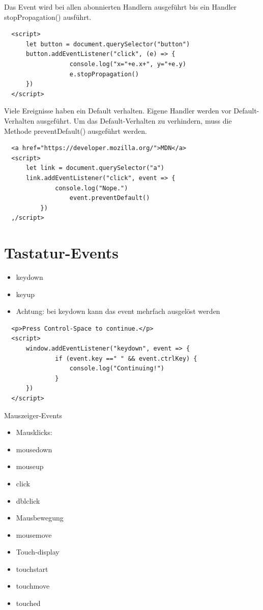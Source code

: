   Das Event wird bei allen abonnierten Handlern ausgeführt bis ein Handler stopPropagation() ausführt.
  
  \begin{verbatim}
  <script>
      let button = document.querySelector("button")
      button.addEventListener("click", (e) => {
                  console.log("x="+e.x+", y="+e.y)
                  e.stopPropagation()
      })
  </script>
  \end{verbatim}
  
  Viele Ereignisse haben ein Default verhalten. Eigene Handler werden vor Default-Verhalten ausgeführt. Um das Default-Verhalten zu verhindern, muss die Methode preventDefault() ausgeführt werden.
  
  \begin{verbatim}
  <a href="https://developer.mozilla.org/">MDN</a>
  <script>
      let link = document.querySelector("a")
      link.addEventListener("click", event => {
              console.log("Nope.")
                  event.preventDefault()
          })
  ,/script>
  \end{verbatim}
  
  \section*{Tastatur-Events}
  \begin{itemize}
    \item keydown
    \item keyup
    \item Achtung: bei keydown kann das event mehrfach ausgelöst werden
  \end{itemize}
  
  \begin{verbatim}
  <p>Press Control-Space to continue.</p>
  <script>
      window.addEventListener("keydown", event => {
              if (event.key ==" " && event.ctrlKey) {
                  console.log("Continuing!")
              }
      })
  </script>
  \end{verbatim}
  
  Mauszeiger-Events
  
  \begin{itemize}
    \item Mausklicks:
    \item mousedown
    \item mouseup
    \item click
    \item dblclick
    \item Mausbewegung
    \item mousemove
    \item Touch-display
    \item touchstart
    \item touchmove
    \item touched
  \end{itemize}
  
